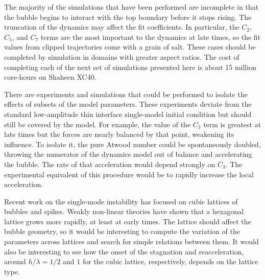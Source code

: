 The majority of the simulations that have been performed are incomplete in that the bubble begins to interact with the top boundary before it stops rising.
The truncation of the dynamics may affect the fit coefficients.
In particular, the $C_2$, $C_5$, and $C_7$ terms are the most important to the dynamics at late times, so the fit values from clipped trajectories come with a grain of salt.
These cases should be completed by simulation in domains with greater aspect ratios.
The cost of completing each of the next set of simulations presented here is about 15 million core-hours on Shaheen XC40.

There are experiments and simulations that could be performed to isolate the effects of subsets of the model parameters.
These experiments deviate from the standard low-amplitude thin interface single-model initial condition but should still be covered by the model.
For example, the value of the $C_3$ term is greatest at late times but the forces are nearly balanced by that point, weakening its influence.
To isolate it, the pure Atwood number could be spontaneously doubled, throwing the numerator of the dynamics model out of balance and accelerating the bubble.
The rate of that acceleration would depend strongly on $C_3$.
The experimental equivalent of this procedure would be to rapidly increase the local acceleration.

Recent work on the single-mode instability has focused on cubic lattices of bubbles and spikes.
Weakly non-linear theories have shown that a hexagonal lattice grows more rapidly, at least at early times.
The lattice should affect the bubble geometry, so it would be interesting to compute the variation of the parameters across lattices and search for simple relations between them.
It would also be interesting to see how the onset of the stagnation and reacceleration, around $h / \lambda = 1/2$ and $1$ for the cubic lattice, respectively, depends on the lattice type.

